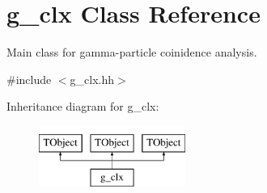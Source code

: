 \hypertarget{classg__clx}{}\section{g\+\_\+clx Class Reference}
\label{classg__clx}


Main class for gamma-\/particle coinidence analysis.  




{\ttfamily \#include $<$g\+\_\+clx.\+hh$>$}

Inheritance diagram for g\+\_\+clx\+:\begin{figure}[H]
\begin{center}
\leavevmode
\includegraphics[height=2.000000cm]{classg__clx}
\end{center}
\end{figure}
